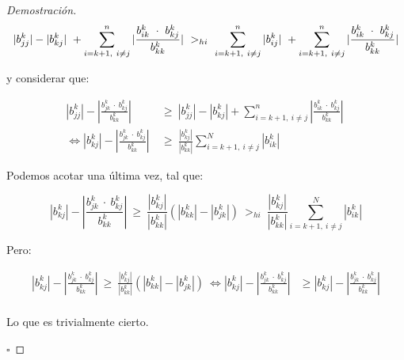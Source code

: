 \begin{proof}[Demostración]
\begin{equation*}
    |b^k_{jj}| - |b^k_{kj}|\ +  \sum_{i=k+1, \ i \neq j}^{n} |\frac{b^k_{ik} \ \cdot \ b^k_{kj}}{b^k_{kk}}|\
        >_{hi}\ \sum_{i=k+1,\ i \neq j}^{n} |b^k_{ij}|\ +  \sum_{i=k+1,\ i \neq j}^{n} |\frac{b^k_{ik} \ \cdot \ b^k_{kj}}{b^k_{kk}}| \\
\end{equation*}

\vspace{1em}
\noindent y considerar que:

\begin{align*}
    |b^k_{jj}| - |\frac {b^k_{jk} \ \cdot \ b^k_{kj}}{b^k_{kk}}|\ 
        &\geq\ |b^k_{jj}| - |b^k_{kj}| +  \sum_{i=k+1, \ i \neq j}^{n} |\frac{b^k_{ik} \ \cdot \ b^k_{kj}}{b^k_{kk}}|\ \\  
    \iff |b^k_{kj}| - |\frac {b^k_{jk}\ \cdot \ b^k_{kj}}{b^k_{kk}}|\ 
        &\geq\ \frac{ |b^k_{kj}|}{|b^k_{kk}|} \sum_{i=k+1, \ i \neq j}^{N} |b^k_{ik}|
\end{align*}

\vspace{1em}
\noindent Podemos acotar una última vez, tal que:

\begin{equation*}
    |b^k_{kj}| - |\frac {b^k_{jk}\ \cdot \ b^k_{kj}}{b^k_{kk}}|\ 
        \geq\ \frac{|b^k_{kj}|}{|b^k_{kk}|} (|b^k_{kk}| - |b^k_{jk}|)\
        >_{hi}\ \frac{ |b^k_{kj}|}{|b^k_{kk}|} \sum_{i=k+1, \ i \neq j}^{N} |b^k_{ik}|
\end{equation*}

\vspace{1em}
\noindent Pero:

\begin{align*}
    |b^k_{kj}| - |\frac {b^k_{jk}\ \cdot \ b^k_{kj}}{b^k_{kk}}|\ 
        \geq\ \frac{|b^k_{kj}|}{|b^k_{kk}|} (|b^k_{kk}| - |b^k_{jk}|)\
    \iff |b^k_{kj}| - |\frac {b^k_{jk}\ \cdot\ b^k_{kj}}{b^k_{kk}}| 
        &\geq  |b^k_{kj}| - |\frac{b^k_{jk}\ \cdot \ b^k_{kj}}{b^k_{kk}}|\\
\end{align*}

\vspace{1em}
\noindent Lo que es trivialmente cierto. 

\hfill$\square$



\end{proof}
